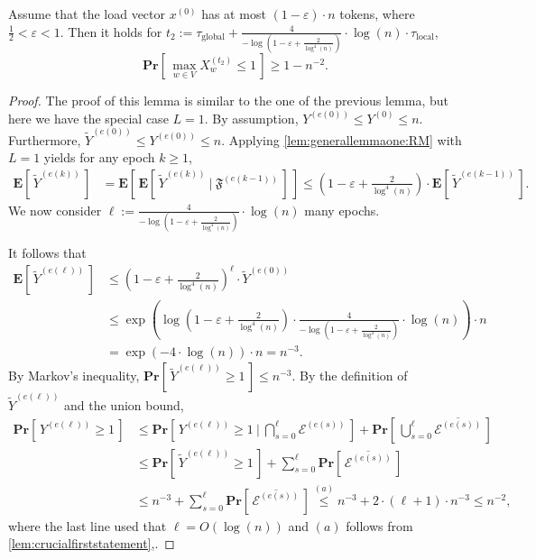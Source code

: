 \documentclass[twoside,leqno]{article}
\newcommand*{\cE}{\mathcal{E}}
\newcommand{\Pro}[1]{\mathbf{Pr} \left[\,#1\,\right]}
\newcommand{\Ex}[1]{\mathbf{E} \left[\,#1\,\right]}
\DeclareMathOperator{\1}{\mathbf{1}}
\newcommand{\taulocal}{\tau_{\mathrm{local}}}
\newcommand{\tauglobal}{\tau_{\mathrm{global}}}
\numberwithin{equation}{section}
\let\epsilon\varepsilon
\begin{document}
\begin{lemma}[Phase 2]
\label{lem:rmlemmaphasetwo}
Assume that the load vector $x^{(0)}$ has at most $(1-\epsilon) \cdot n$ tokens, where $\frac{1}{2} < \epsilon < 1$. Then it holds for $t_2:=\tauglobal+\frac{4}{-\log \left( 1 - \epsilon + \frac{2}{\log^4 (n)} \right)} \cdot \log(n) \cdot \taulocal$,
\[
\Pro{ \max_{w \in V} X_{w}^{(t_2)} \leq 1 } \geq 1 - n^{-2}.
\]
\end{lemma}
\begin{proof}
    The proof of this lemma is similar to the one of the previous lemma, but here we have the special case $L=1$.
By assumption, $Y^{(e(0))}\leq Y^{(0)} \leq n$. Furthermore, $\tilde{Y}^{(e(0))} \leq Y^{(e(0))} \leq n$.
Applying \cref{lem:generallemmaone:RM} with $L=1$ yields for any epoch $k \geq 1$,
\begin{align*}
\Ex{ \tilde{Y}^{(e(k))}} &= \Ex{\Ex{ \tilde{Y}^{(e(k))}~\Big|~\mathfrak{F}^{(e(k-1))}} } \leq \left( 1 - \epsilon + \frac{2}{\log^4 (n)} \right) \cdot \Ex{\tilde{Y}^{(e(k-1))}}.
\end{align*}
We now consider $\ell:=\frac{4}{-\log\left( 1 - \epsilon + \frac{2}{\log^4 (n)} \right)} \cdot \log(n)$ many epochs. 

It follows that
\begin{align*}
\Ex{ \tilde{Y}^{(e(\ell))}} &\leq  \left( 1 - \epsilon + \frac{2}{\log^4 (n)} \right)^{\ell} \cdot \widetilde{Y}^{(e(0))}
\\ &\leq \exp\left( \log \left( 1 - \epsilon + \frac{2}{\log^4 (n)} \right) \cdot \frac{4}{-\log \left( 1 - \epsilon + \frac{2}{\log^4 (n)} \right)} \cdot \log(n) \right) \cdot n \\
&=\exp\left(-4\cdot \log(n)\right) \cdot n =  n^{-3}.
\end{align*}
By Markov's inequality,
$\Pro{ \tilde{Y}^{(e(\ell))} \geq 1} \leq n^{-3}$.
By the definition of $\tilde{Y}^{(e(\ell))}$ and the union bound,
\begin{align*}
\Pro{ Y^{(e(\ell))} \ge 1}
&\le \Pro{ Y^{(e(\ell))} \ge 1 ~\Big|~ \bigcap_{s=0}^{\ell} \cE^{(e(s))} } + \Pro{\bigcup_{s=0}^{\ell} \overline{\mathcal{E}^{(e(s))}}}
\\
&\leq \Pro{ \tilde{Y}^{(e(\ell))} \ge 1 } + \sum_{s=0}^{\ell} \Pro{ \overline{\mathcal{E}^{(e(s))}}}\\
&\leq n^{-3} + \sum_{s=0}^{\ell} \Pro{ \overline{\mathcal{E}^{(e(s))}}}
\stackrel{(a)}{\leq} n^{-3} + 2\cdot (\ell+1) \cdot n^{-3} \leq n^{-2},
\end{align*}
where the last line used that $\ell=O(\log(n))$ and $(a)$ follows from \cref{lem:crucialfirststatement},.
\end{proof}
\end{document}
